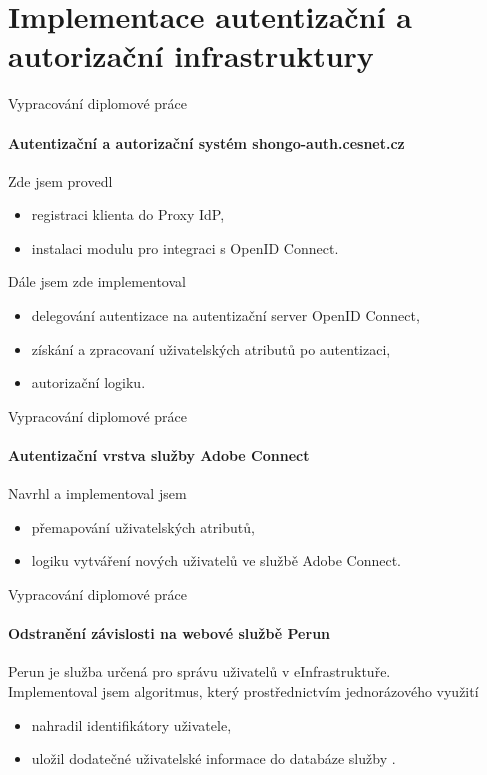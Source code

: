 \documentclass[
]{beamer}
\begin{document}
\section[Implementace autentizační a autorizační infrastruktury]{Implementace autentizační a autorizační infrastruktury}

\begin{frame}{Vypracování diplomové práce}
\framesubtitle{Autentizační a autorizační systém shongo-auth.cesnet.cz}
Zde jsem provedl
\begin{itemize}
    \item registraci klienta do Proxy IdP,
    \item instalaci modulu pro integraci s OpenID Connect.
\end{itemize}

Dále jsem zde implementoval
\begin{itemize}
     \item delegování autentizace na autentizační server OpenID Connect,
    \item  získání a zpracovaní uživatelských atributů po autentizaci,
    \item  autorizační logiku.
\end{itemize}

\end{frame}

\begin{frame}{Vypracování diplomové práce}
\framesubtitle{Autentizační vrstva služby Adobe Connect}
Navrhl a implementoval jsem
\begin{itemize}
    \item přemapování uživatelských atributů,
    \item logiku vytváření nových uživatelů ve službě Adobe Connect.
\end{itemize}
\end{frame}


\begin{frame}{Vypracování diplomové práce}
\framesubtitle{Odstranění závislosti na webové službě Perun}
Perun je služba určená pro správu uživatelů v eInfrastruktuře. 
\\
\medskip
Implementoval jsem algoritmus, který prostřednictvím jednorázového využití  
\begin{itemize}
    \item nahradil identifikátory uživatele,
    \item uložil dodatečné uživatelské informace do databáze služby .
\end{itemize}
\end{frame}
\end{document}
